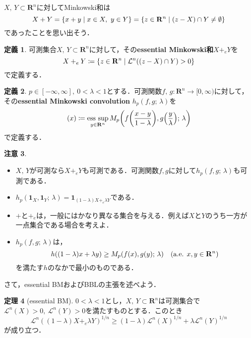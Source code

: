 \documentclass[a4j]{ltjsarticle}
\newcommand{\Rset}{\mathbf{R}}
\newcommand{\Lm}{\mathcal{L}}
\newcommand{\1}{\bm{1}}
\newcommand{\M}[4]{M_{#1}\qty(#2,#3;\,#4)}
\DeclareMathOperator*{\esssup}{\mathrm{ess}\,\sup}\DeclareMathOperator*{\essinf}{\mathrm{ess}\,\inf}
\numberwithin{equation}{section}
\theoremstyle{definition}
\newtheorem{thm}{定理}[section]
\newtheorem{dfn}[thm]{定義}
\newtheorem{rmk}[thm]{注意}
\begin{document}
$X,\,Y\subset\Rset^n$に対してMinkowski和は
\begin{equation}
    X+Y=\qty{x+y\mid x\in X,\ y\in Y}=\qty{z\in \Rset^n\mid (z-X)\cap Y\neq\emptyset}
\end{equation}
であったことを思い出そう．
\begin{dfn}
    可測集合$X,\,Y\subset\Rset^n$に対して，その\textbf{essential Minkowski和}$X+_eY$を
    \begin{equation}
        X+_{e}Y\coloneqq \qty{z\in\Rset^n\mid \Lm^n((z-X)\cap Y)>0}
    \end{equation}
    で定義する．
\end{dfn}
\begin{dfn}
    $p\in[-\infty,\infty],\ 0<\lambda<1$とする．可測関数$f,\,g\colon\Rset^n\to[0,\infty)$に対して，その\textbf{essential Minkowski convolution} $h_p(f,g;\,\lambda)$を
    \begin{equation}
        [h_p(f,g;\,\lambda)](x)\coloneqq \esssup_{y\in\Rset^n}\M{p}{f\qty(\frac{x-y}{1-\lambda})}{g\qty(\frac{y}{\lambda})}{\lambda}
    \end{equation}
    で定義する．
\end{dfn}
\begin{rmk}
    \begin{itemize}
        \item $X,\,Y$が可測なら$X+_eY$も可測である．可測関数$f,g$に対して$h_p(f,g;\,\lambda)$も可測である．
        \item $h_p(\1_X,\1_Y;\,\lambda)=\1_{(1-\lambda)X+_e \lambda Y}$である．
        \item $+$と$+_e$は，一般にはかなり異なる集合を与える．例えば$X$と$Y$のうち一方が一点集合である場合を考えよ．
        \item $h_p(f,g;\,\lambda)$は，
        \begin{equation}
            h((1-\lambda)x+\lambda y)\geq \M{p}{f(x)}{g(y)}{\lambda}\quad (\text{a.e. $x,y\in\Rset^n$})
        \end{equation}
        を満たす$h$のなかで最小のものである．
    \end{itemize}
\end{rmk}
さて，essential BMおよびBBLの主張を述べよう．
\begin{thm}[essential BM]\label{thm:ess_bm}
    $0<\lambda<1$とし，$X,\,Y\subset \Rset^n$は可測集合で\underline{$\Lm^n(X)>0,\ \Lm^n(Y)>0$}を満たすものとする．このとき
    \begin{equation}
        \Lm^n((1-\lambda)X+_e\lambda Y)^{1/n}\geq (1-\lambda)\Lm^n(X)^{1/n}+\lambda \Lm^n(Y)^{1/n}\label{eq:ess_bm}\tag{EssBM}
    \end{equation}
    が成り立つ．
\end{thm}
\end{document}
